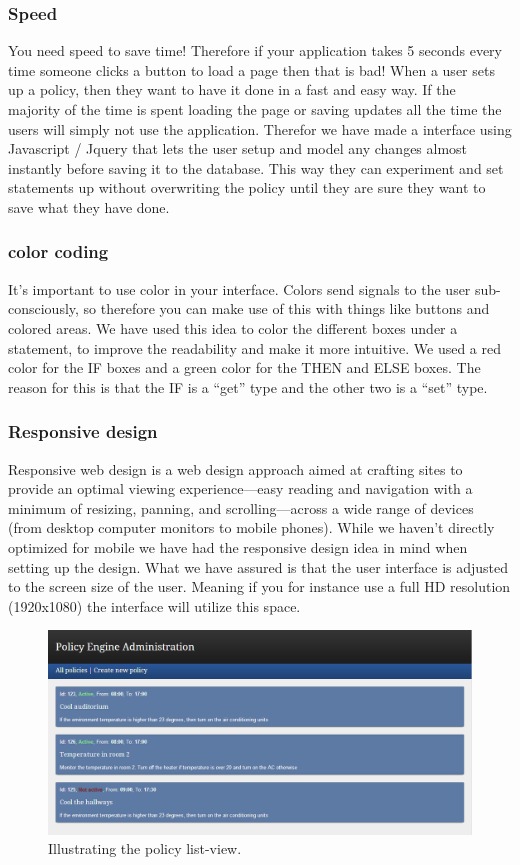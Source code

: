 \subsubsection{Speed}
You need speed to save time! Therefore if your application takes 5 seconds every time someone clicks a button to load a page then that is bad! When a user sets up a policy, then they want to have it done in a fast and easy way. If the majority of the time is spent loading the page or saving updates all the time the users will simply not use the application. Therefor we have made a interface using Javascript / Jquery that lets the user setup and model any changes almost instantly before saving it to the database. This way they can experiment and set statements up without overwriting the policy until they are sure they want to save what they have done.

\subsubsection{color coding}
It's important to use color in your interface. Colors send signals to the user sub-consciously, so therefore you can make use of this with things like buttons and colored areas. We have used this idea to color the different boxes under a statement, to improve the readability and make it more intuitive. We used a red color for the IF boxes and a green color for the THEN and ELSE boxes. The reason for this is that the IF is a "`get"' type and the other two is a "`set"' type.

\subsubsection{Responsive design}
Responsive web design is a web design approach aimed at crafting sites to provide an optimal viewing experience—easy reading and navigation with a minimum of resizing, panning, and scrolling—across a wide range of devices (from desktop computer monitors to mobile phones). While we haven't directly optimized for mobile we have had the responsive design idea in mind when setting up the design. What we have assured is that the user interface is adjusted to the screen size of the user. Meaning if you for instance use a full HD resolution (1920x1080) the interface will utilize this space.

\begin{figure}[h!]
\centering
\includegraphics[width=\columnwidth]{policylist.png}
\caption{Illustrating the policy list-view.}
\label{fig:policylist}
\end{figure}



